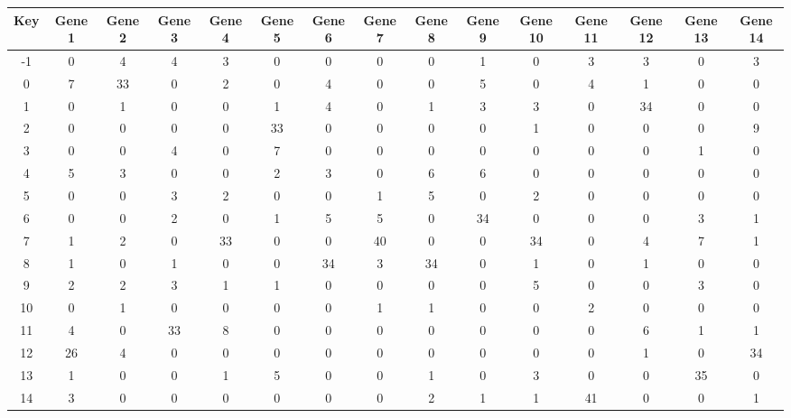 \begin{tabular}{|c|c|c|c|c|c|c|c|c|c|c|c|c|c|c|}
\hline
Key & Gene 1 & Gene 2 & Gene 3 & Gene 4 & Gene 5 & Gene 6 & Gene 7 & Gene 8 & Gene 9 & Gene 10 & Gene 11 & Gene 12 & Gene 13 & Gene 14 \\
\hline
-1 & 0 & 4 & 4 & 3 & 0 & 0 & 0 & 0 & 1 & 0 & 3 & 3 & 0 & 3 \\
0 & 7 & 33 & 0 & 2 & 0 & 4 & 0 & 0 & 5 & 0 & 4 & 1 & 0 & 0 \\
1 & 0 & 1 & 0 & 0 & 1 & 4 & 0 & 1 & 3 & 3 & 0 & 34 & 0 & 0 \\
2 & 0 & 0 & 0 & 0 & 33 & 0 & 0 & 0 & 0 & 1 & 0 & 0 & 0 & 9 \\
3 & 0 & 0 & 4 & 0 & 7 & 0 & 0 & 0 & 0 & 0 & 0 & 0 & 1 & 0 \\
4 & 5 & 3 & 0 & 0 & 2 & 3 & 0 & 6 & 6 & 0 & 0 & 0 & 0 & 0 \\
5 & 0 & 0 & 3 & 2 & 0 & 0 & 1 & 5 & 0 & 2 & 0 & 0 & 0 & 0 \\
6 & 0 & 0 & 2 & 0 & 1 & 5 & 5 & 0 & 34 & 0 & 0 & 0 & 3 & 1 \\
7 & 1 & 2 & 0 & 33 & 0 & 0 & 40 & 0 & 0 & 34 & 0 & 4 & 7 & 1 \\
8 & 1 & 0 & 1 & 0 & 0 & 34 & 3 & 34 & 0 & 1 & 0 & 1 & 0 & 0 \\
9 & 2 & 2 & 3 & 1 & 1 & 0 & 0 & 0 & 0 & 5 & 0 & 0 & 3 & 0 \\
10 & 0 & 1 & 0 & 0 & 0 & 0 & 1 & 1 & 0 & 0 & 2 & 0 & 0 & 0 \\
11 & 4 & 0 & 33 & 8 & 0 & 0 & 0 & 0 & 0 & 0 & 0 & 6 & 1 & 1 \\
12 & 26 & 4 & 0 & 0 & 0 & 0 & 0 & 0 & 0 & 0 & 0 & 1 & 0 & 34 \\
13 & 1 & 0 & 0 & 1 & 5 & 0 & 0 & 1 & 0 & 3 & 0 & 0 & 35 & 0 \\
14 & 3 & 0 & 0 & 0 & 0 & 0 & 0 & 2 & 1 & 1 & 41 & 0 & 0 & 1 \\
\hline
\end{tabular}